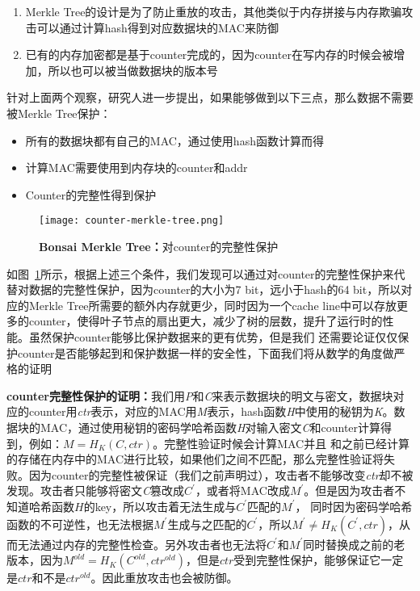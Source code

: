 \begin{enumerate}
    \item Merkle Tree的设计是为了防止重放的攻击，其他类似于内存拼接与内存欺骗攻击可以通过计算hash得到对应数据块的MAC来防御
    \item 已有的内存加密都是基于counter完成的，因为counter在写内存的时候会被增加，所以也可以被当做数据块的版本号
\end{enumerate}
针对上面两个观察，研究人进一步提出，如果能够做到以下三点，那么数据不需要被Merkle Tree保护：
\begin{itemize}
    \item 所有的数据块都有自己的MAC，通过使用hash函数计算而得
    \item 计算MAC需要使用到内存块的counter和addr
    \item Counter的完整性得到保护
\end{itemize}
\begin{figure}[!htp]
    \centering
    \texttt{[image: counter-merkle-tree.png]}
    \caption{\textbf{Bonsai Merkle Tree：}对counter的完整性保护 }
   \label{fig:counter-merkle-tree.png}
\end{figure}
如图~\ref{fig:counter-merkle-tree.png}所示，根据上述三个条件，我们发现可以通过对counter的完整性保护来代替对数据的完整性保护，因为counter的大小为7 bit，远小于hash的64 bit，所以对应的Merkle Tree所需要的额外内存就更少，同时因为一个cache line中可以存放更多的counter，使得叶子节点的扇出更大，减少了树的层数，提升了运行时的性能。虽然保护counter能够比保护数据来的更有优势，但是我们
还需要论证仅仅保护counter是否能够起到和保护数据一样的安全性，下面我们将从数学的角度做严格的证明

\textbf{counter完整性保护的证明：}我们用\emph{P}和\emph{C}来表示数据块的明文与密文，数据块对应的counter用\emph{ctr}表示，对应的MAC用\emph{M}表示，hash函数\emph{H}中使用的秘钥为\emph{K}。数据块的MAC，通过使用秘钥的密码学哈希函数\emph{H}对输入密文\emph{C}和counter计算得到，例如：$M = H_K(C, ctr)$。完整性验证时候会计算MAC并且
和之前已经计算的存储在内存中的MAC进行比较，如果他们之间不匹配，那么完整性验证将失败。因为counter的完整性被保证（我们之前声明过），攻击者不能够改变\emph{ctr}却不被发现。攻击者只能够将密文\emph{C}篡改成$C^{\prime}$，或者将MAC改成$M^{\prime}$。但是因为攻击者不知道哈希函数$H$的key，所以攻击着无法生成与$C^{\prime}$匹配的$M^{\prime}$，
同时因为密码学哈希函数的不可逆性，也无法根据$M^{\prime}$生成与之匹配的$C^{\prime}$，所以$M^{\prime} \neq H_K(C^{\prime}, ctr)$，从而无法通过内存的完整性检查。另外攻击者也无法将$C^{\prime}$和$M^{\prime}$同时替换成之前的老版本，因为$M^{old} = H_K(C^{old}, ctr^{old})$，但是$ctr$受到完整性保护，能够保证它一定是$ctr$和不是$ctr^{old}$。因此重放攻击也会被防御。


